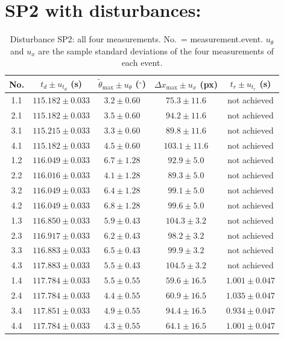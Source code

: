 \documentclass[11pt,a4paper]{article}
\begin{document}
\section{SP2 with disturbances: }
\begin{table}[H]
    \centering
    \caption{Disturbance SP2: all four measurements. No.\ = measurement.event.
    $u_\theta$ and $u_x$ are the sample standard deviations of the four
    measurements of each event.}
    \label{tab:sp2_disturbance}
    \renewcommand{\arraystretch}{1.6}
    \begin{tabular}{|c|c|c|c|c|}
        \hline
        No.
        & $t_d \pm u_{t_d}$ (s)
        & $\tilde{\theta}_\text{max} \pm u_\theta$ ($^\circ$)
        & $\Delta x_\text{max} \pm u_x$ (px)
        & $t_r \pm u_{t_r}$ (s) \\
        \hline
        1.1 & $115.182 \pm 0.033$ & $3.2 \pm 0.60$ & $75.3 \pm 11.6$  & not achieved \\ \hline
        2.1 & $115.182 \pm 0.033$ & $3.5 \pm 0.60$ & $94.2 \pm 11.6$  & not achieved \\ \hline
        3.1 & $115.215 \pm 0.033$ & $3.3 \pm 0.60$ & $89.8 \pm 11.6$  & not achieved \\ \hline
        4.1 & $115.182 \pm 0.033$ & $4.5 \pm 0.60$ & $103.1 \pm 11.6$ & not achieved \\ \hline\hline
        1.2 & $116.049 \pm 0.033$ & $6.7 \pm 1.28$ & $92.9 \pm 5.0$   & not achieved \\ \hline
        2.2 & $116.016 \pm 0.033$ & $4.1 \pm 1.28$ & $89.3 \pm 5.0$   & not achieved \\ \hline
        3.2 & $116.049 \pm 0.033$ & $6.4 \pm 1.28$ & $99.1 \pm 5.0$   & not achieved \\ \hline
        4.2 & $116.049 \pm 0.033$ & $6.8 \pm 1.28$ & $99.6 \pm 5.0$   & not achieved \\ \hline\hline
        1.3 & $116.850 \pm 0.033$ & $5.9 \pm 0.43$ & $104.3 \pm 3.2$  & not achieved \\ \hline
        2.3 & $116.917 \pm 0.033$ & $6.2 \pm 0.43$ & $98.2 \pm 3.2$   & not achieved \\ \hline
        3.3 & $116.883 \pm 0.033$ & $6.5 \pm 0.43$ & $99.9 \pm 3.2$   & not achieved \\ \hline
        4.3 & $117.883 \pm 0.033$ & $5.5 \pm 0.43$ & $104.5 \pm 3.2$  & not achieved \\ \hline\hline
        1.4 & $117.784 \pm 0.033$ & $5.5 \pm 0.55$ & $59.6 \pm 16.5$  & $1.001 \pm 0.047$ \\ \hline
        2.4 & $117.784 \pm 0.033$ & $4.4 \pm 0.55$ & $60.9 \pm 16.5$  & $1.035 \pm 0.047$ \\ \hline
        3.4 & $117.851 \pm 0.033$ & $4.9 \pm 0.55$ & $94.4 \pm 16.5$  & $0.934 \pm 0.047$ \\ \hline
        4.4 & $117.784 \pm 0.033$ & $4.3 \pm 0.55$ & $64.1 \pm 16.5$  & $1.001 \pm 0.047$ \\ \hline
    \end{tabular}
\end{table}
\end{document}
